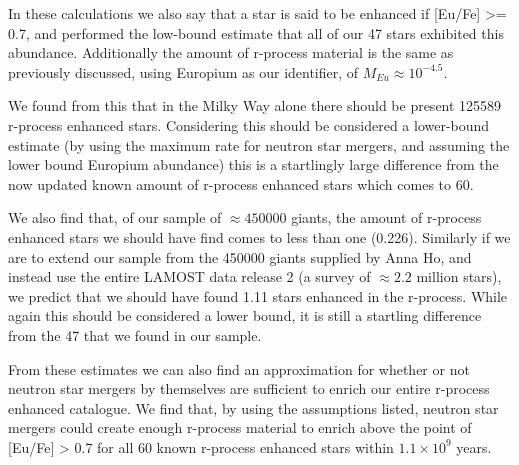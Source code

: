 \documentclass[a4paper,fleqn,usenatbib]{mnras}
\begin{document}
	In these calculations we also say that a star is said to be enhanced if [Eu/Fe] >= 0.7, and performed the low-bound estimate that all of our 47 stars exhibited this abundance. Additionally the amount of r-process material is the same as previously discussed, using Europium as our identifier, of $M_{Eu}\approx10^{-4.5}$.
	
    We found from this that in the Milky Way alone there should be present 125589 r-process enhanced stars. Considering this should be considered a lower-bound estimate (by using the maximum rate for neutron star mergers, and assuming the lower bound Europium abundance) this is a startlingly large difference from the now updated known amount of r-process enhanced stars which comes to 60. 
    
    We also find that, of our sample of $\approx450000$ giants, the amount of r-process enhanced stars we should have find comes to less than one (0.226). Similarly if we are to extend our sample from the 450000 giants supplied by Anna Ho, and instead use the entire LAMOST data release 2 (a survey of $\approx2.2$ million stars), we predict that we should have found 1.11 stars enhanced in the r-process. While again this should be considered a lower bound, it is still a startling difference from the 47 that we found in our sample.
    
    From these estimates we can also find an approximation for whether or not neutron star mergers by themselves are sufficient to enrich our entire r-process enhanced catalogue. We find that, by using the assumptions listed, neutron star mergers could create enough r-process material to enrich above the point of [Eu/Fe] > 0.7 for all 60 known r-process enhanced stars within $1.1\times10^9$ years. 
    
    
	
\end{document}
